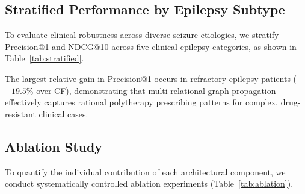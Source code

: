\documentclass[11pt,a4paper]{article}
\begin{document}
\subsection{Stratified Performance by Epilepsy Subtype}
To evaluate clinical robustness across diverse seizure etiologies, we stratify Precision@1 and NDCG@10 across five clinical epilepsy categories, as shown in Table~\ref{tab:stratified}.

\begin{table}[h]
\centering
\caption{\textbf{Performance Stratified by Epilepsy Clinical Subtype.} Comparison between Collaborative Filtering baseline and GraphEpiRec across test set patient cohorts.}
\label{tab:stratified}
\small
{}
\end{table}

The largest relative gain in Precision@1 occurs in refractory epilepsy patients ($+19.5\%$ over CF), demonstrating that multi-relational graph propagation effectively captures rational polytherapy prescribing patterns for complex, drug-resistant clinical cases.

\subsection{Ablation Study}

To quantify the individual contribution of each architectural component, we conduct systematically controlled ablation experiments (Table~\ref{tab:ablation}).
\end{document}
